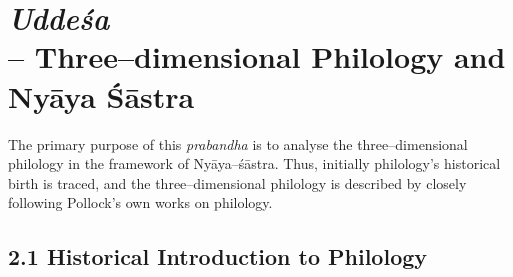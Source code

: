 
\chapter{{\it {\bfseries Uddeśa}}\\ – Three–dimensional Philology and Nyāya Śāstra}\label{chapter2}

The primary purpose of this \textit{prabandha} is to analyse the three–dimen\-sional philology in the framework of Nyāya–śāstra. Thus, initially philology’s historical birth is traced, and the three–dimensional philology is described by closely following Pollock’s own works on philology.

\section*{2.1 Historical Introduction to Philology}

